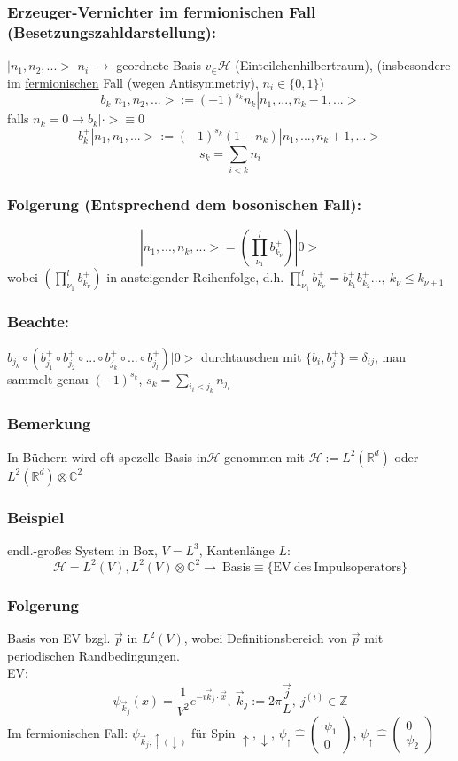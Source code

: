 \documentclass[twoside,a4paper]{scrartcl}
\newcommand{\R}{\mathbb{R}}
\newcommand{\C}{\mathbb{C}}
\renewcommand{\1}{\mathds{1}}
\newcommand{\ra}{\rightarrow}
\renewcommand{\H}{\mathcal{H}}
\renewcommand{\R}{\mathbb{R}}
\renewcommand{\C}{\mathbb{C}}
\begin{document}
\subsubsection*{Erzeuger-Vernichter im fermionischen Fall (Besetzungszahldarstellung):}
$|n_1,n_2,...>$ $n_i$ $\ra$ geordnete Basis $v_\in \H$ (Einteilchenhilbertraum), (insbesondere im  \underline{fermionischen} Fall (wegen Antisymmetriy), $n_i\in \{0,1\}$)
$$b_k|n_1,n_2,...>:=(-1)^{s_k} n_k|n_1,...,n_k-1,...>$$
falls $n_k=0 \ra b_k|\cdot>\equiv 0$
$$b_k^+|n_1,n_1,...>:=(-1)^{s_k} (1-n_k)|n_1,...,n_k+1,...>$$
$$s_k=\sum_{i<k}n_i$$
\subsubsection*{Folgerung (Entsprechend dem bosonischen Fall):}
$$|n_1,...,n_k,...>=(\prod_{\nu_1}^l b_{k_\nu}^+)|0>$$
wobei $(\prod_{\nu_1}^l b_{k_\nu}^+)$ in ansteigender Reihenfolge, d.h. $\prod_{\nu_1}^l b_{k_\nu}^+=b_{k_1}^+b_{k_2}^+..., \ k_\nu \leq k_{\nu+1}$
\subsubsection*{Beachte:}
$b_{j_k}\circ(b_{j_1}^+\circ b_{j_2}^+ \circ ... \circ b_{j_k}^+ \circ ... \circ b_{j_l}^+)|0>$ durchtauschen mit $\{b_i,b_j^+\}=\delta_{ij}$, man sammelt genau $(-1)^{s_k}$, $s_k=\sum_{i_i< j_k} n_{j_i}$
\subsubsection*{Bemerkung}
In Büchern wird oft spezelle Basis in$\H$ genommen mit $\H:=L^2(\R^d)$ oder $L^2(\R^d)\otimes \C^2$
\subsubsection*{Beispiel}
endl.-großes System in Box, $V=L^3$, Kantenlänge $L$:
$$\H=L^2(V), L^2(V) \otimes \C^2 \ra \ \mathrm{Basis} \equiv \{\mathrm{EV \ des \ Impulsoperators} \}$$
\subsubsection*{Folgerung}
Basis von EV bzgl. $\vec p$ in $L^2(V)$, wobei Definitionsbereich von $\vec p$ mit periodischen Randbedingungen.\\
EV: $$\psi_{\vec k_j}(x)=\frac{1}{V^2}e^{-i\vec k_j \cdot \vec x}, \ \vec k_j:= 2\pi \frac{\vec j}{L}, \ j^{(i)} \in \mathbb{Z}$$
Im fermionischen Fall:
$\psi_{\vec k_j, \uparrow(\downarrow)}$ für Spin $\uparrow,\downarrow$, $\psi_\uparrow \mathrel{\widehat{=}} \begin{pmatrix}\psi_1\\ 0 \end{pmatrix}$, $\psi_\uparrow \mathrel{\widehat{=}} \begin{pmatrix}0\\ \psi_2 \end{pmatrix}$
\end{document}
